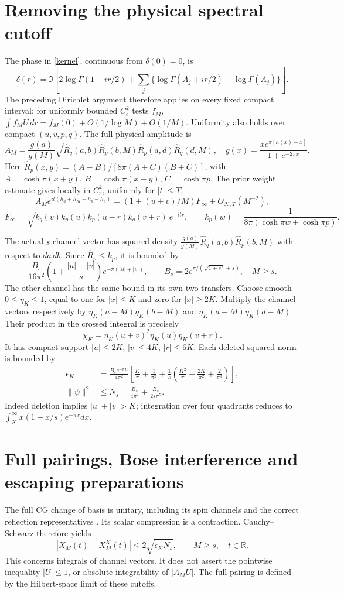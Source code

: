 \documentclass[11pt,a4paper]{article}
\newcommand{\Rh}{\widehat R}
\begin{document}
\newpage
\section{Removing the physical spectral cutoff}
The phase in \eqref{kernel}, continuous from $\delta(0)=0$, is
\[
 \delta(r)=\Im\left[2\log\Gamma(1-ir/2)+
       \sum_j\{\log\Gamma(A_j+ir/2)-\log\Gamma(A_j)\}\right].
\]
The preceding Dirichlet argument therefore applies on every fixed
compact interval: for uniformly bounded $C_c^2$ tests $f_M$,
$\int f_M U\,dr=f_M(0)+O(1/\log M)+O(1/M)$.
Uniformity also holds over compact $(u,v,p,q)$.
The full physical amplitude is
\[
 A_M=\frac{g(a)}{g(M)}
 \sqrt{\Rh_q(a,b)\Rh_p(b,M)\Rh_p(a,d)\Rh_q(d,M)},\quad
 g(x)=\frac{x e^{\pi[h(x)-x]}}{1+e^{-2\pi x}}.
\]
Here $\Rh_p(x,y)=(A-B)/[8\pi(A+C)(B+C)]$, with
$A=\cosh\pi(x+y)$, $B=\cosh\pi(x-y)$, $C=\cosh\pi p$.
The prior weight estimate gives locally in $C_r^2$, uniformly for
$|t|\le T$,
\[
 A_M e^{it(h_a+h_M-h_b-h_d)}
 =(1+(u+v)/M)F_\infty+O_{\mathcal K,T}(M^{-2}),
\]
\[
 F_\infty=\sqrt{k_q(v)k_p(u)k_p(u-r)k_q(v+r)}\,e^{-itr},
 \qquad k_p(w)=\frac1{8\pi(\cosh\pi w+\cosh\pi p)}.
\]

The actual $s$-channel vector has squared density
$\frac{g(a)}{g(M)}\Rh_q(a,b)\Rh_p(b,M)$ with respect to $da\,db$.
Since $\Rh_p\le k_p$, it is bounded by
\[
 \frac{B_s}{16\pi^2}
 \left(1+\frac{|u|+|v|}{s}\right)e^{-\pi(|u|+|v|)},\qquad
 B_s=2e^{\pi/(\sqrt{1+s^2}+s)},\quad M\ge s.
\]
The other channel has the same bound in its own two transfers.
Choose smooth $0\le\eta_K\le1$, equal to one for $|x|\le K$ and
zero for $|x|\ge2K$. Multiply the channel vectors respectively by
$\eta_K(a-M)\eta_K(b-M)$ and $\eta_K(a-M)\eta_K(d-M)$.
Their product in the crossed integral is precisely
\[
 \chi_K=\eta_K(u+v)^2\eta_K(u)\eta_K(v+r).
\]
It has compact support $|u|\le2K$, $|v|\le4K$, $|r|\le6K$.
Each deleted squared norm is bounded by
\begin{align}
 \epsilon_K&=\frac{B_se^{-\pi K}}{4\pi^2}
 \left[\frac K\pi+\frac1{\pi^2}
 +\frac1s\left(\frac{K^2}\pi+\frac{2K}{\pi^2}+\frac2{\pi^3}\right)\right],
 \label{epsilon}\\
 \|\psi\|^2&\le\overline N_s=\frac{B_s}{4\pi^4}+\frac{B_s}{2s\pi^5}.
 \nonumber
\end{align}
Indeed deletion implies $|u|+|v|>K$; integration over four quadrants
reduces to $\int_K^\infty x(1+x/s)e^{-\pi x}dx$.

\newpage
\section{Full pairings, Bose interference and escaping preparations}
The full CG change of basis is unitary, including its spin channels
and the correct reflection representatives \cite{ds}. Its scalar
compression is a contraction. Cauchy--Schwarz therefore yields
\begin{equation}
 |X_M(t)-X_M^K(t)|\le
 2\sqrt{\epsilon_K\overline N_s},
 \qquad M\ge s,\quad t\in\mathbb R.
 \label{hilbert}
\end{equation}
This concerns integrals of channel vectors. It does not assert the
pointwise inequality $|U|\le1$, or absolute integrability of $|A_MU|$.
The full pairing is defined by the Hilbert-space limit of these cutoffs.
\end{document}
